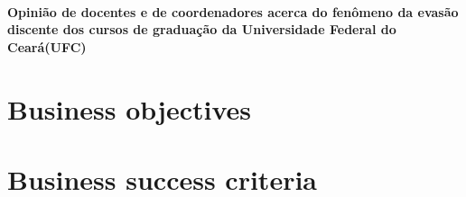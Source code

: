 \documentclass{report}
\begin{document}
\subsubsection{Opinião de docentes e de coordenadores acerca do fenômeno da evasão discente dos cursos de graduação da Universidade Federal do Ceará(UFC)}

\chapter{Business objectives}

\chapter{Business success criteria}

\cite{anuario_2014_base_2013}
\cite{pdi_ufc}



\end{document}
